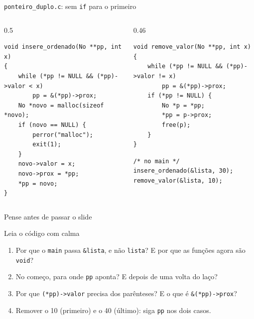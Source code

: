 \documentclass[aspectratio=169]{beamer}
\begin{document}
\begin{frame}[fragile]{\texttt{ponteiro\_duplo.c}: sem \texttt{if} para o primeiro}
  \begin{columns}[T]
    \begin{column}{0.5\textwidth}
\begin{lstlisting}[style=codC]
void insere_ordenado(No **pp, int x)
{
    while (*pp != NULL && (*pp)->valor < x)
        pp = &(*pp)->prox;
    No *novo = malloc(sizeof *novo);
    if (novo == NULL) {
        perror("malloc");
        exit(1);
    }
    novo->valor = x;
    novo->prox = *pp;
    *pp = novo;
}
\end{lstlisting}
    \end{column}
    \begin{column}{0.46\textwidth}
\begin{lstlisting}[style=codC]
void remove_valor(No **pp, int x)
{
    while (*pp != NULL && (*pp)->valor != x)
        pp = &(*pp)->prox;
    if (*pp != NULL) {
        No *p = *pp;
        *pp = p->prox;
        free(p);
    }
}
\end{lstlisting}
\begin{lstlisting}[style=codC]
/* no main */
insere_ordenado(&lista, 30);
remove_valor(&lista, 10);
\end{lstlisting}
    \end{column}
  \end{columns}
\end{frame}

\begin{frame}{Pense antes de passar o slide}
  \begin{block}{Leia o código com calma}
    \begin{enumerate}
      \item Por que o \texttt{main} passa \texttt{\&lista}, e não
        \texttt{lista}? E por que as funções agora são \texttt{void}?
      \item No começo, para onde \texttt{pp} aponta? E depois de uma volta
        do laço?
      \item Por que \texttt{(*pp)->valor} precisa dos parênteses? E o que
        é \texttt{\&(*pp)->prox}?
      \item Remover o 10 (primeiro) e o 40 (último): siga \texttt{pp} nos
        dois casos.
    \end{enumerate}
  \end{block}
\end{frame}
\end{document}
